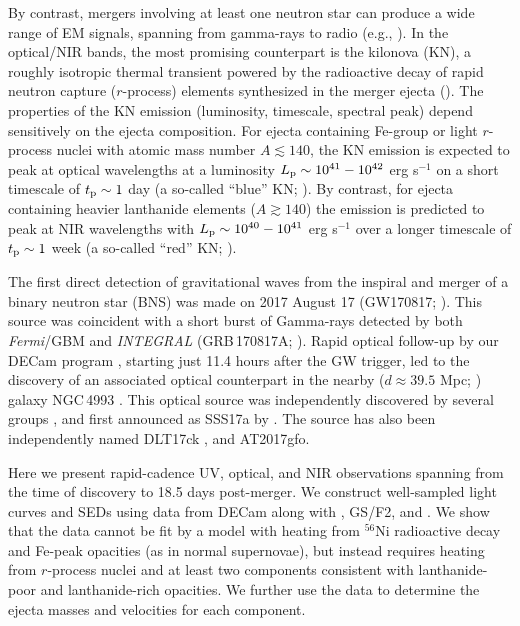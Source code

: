 By contrast, mergers involving at least one neutron star can produce a wide range of EM signals, spanning from gamma-rays to radio (e.g., \citealt{MetzgerBerger12}). In the optical/NIR bands, the most promising counterpart is the kilonova (KN), a roughly isotropic thermal transient powered by the radioactive decay of rapid neutron capture ($r$-process) elements synthesized in the merger ejecta (\citealt{LP98,Metzger+10,Roberts+11,MetzgerBerger12,BarnesKasen13,Tanaka+14}).
The properties of the KN emission (luminosity, timescale, spectral peak) depend sensitively on the ejecta composition.  For ejecta containing Fe-group or light $r$-process nuclei with atomic mass number $A\lesssim 140$, the KN emission is expected to peak at optical wavelengths at a luminosity $L_{\rm p}\sim 10^{41}-10^{42}$ erg s$^{-1}$ on a short timescale of $t_{\rm p}\sim 1$ day (a so-called ``blue'' KN; \citealt{Metzger+10,Roberts+11,MetzgerFernandez14}).  By contrast, for ejecta containing heavier lanthanide elements ($A\gtrsim 140$) the emission is predicted to peak at NIR wavelengths with $L_{\rm p} \sim 10^{40}-10^{41}$ erg s$^{-1}$ over a longer timescale of $t_{\rm p}\sim 1$ week (a so-called ``red'' KN; \citealt{BarnesKasen13,Kasen+13,Tanaka+14}).

The first direct detection of gravitational waves from the inspiral and merger of a binary neutron star (BNS) was made on 2017 August 17 (GW170817; \citealt{LIGOGW170817}). This source was coincident with a short burst of Gamma-rays detected by both {\it Fermi}/GBM and {\it INTEGRAL} (GRB\,170817A; \citealt{GW170817Fermi,Savchenko+17}). Rapid optical follow-up by our DECam program \citep{Flaugher+15}, starting just 11.4 hours after the GW trigger, led to the discovery of an associated optical counterpart in the nearby ($d\approx 39.5$ Mpc; \citealt{Freedman+01}) galaxy NGC\,4993 \citep{GW170817DECam}. This optical source was independently discovered by several groups \citep{LIGOMMAPaper}, and first announced as SSS17a by \cite{Coulter+17}. The source has also been independently named DLT17ck \citep{Valenti+17}, and AT2017gfo.

Here we present rapid-cadence UV, optical, and NIR observations spanning from the time of discovery to 18.5 days post-merger.  We construct well-sampled light curves and SEDs using data from DECam along with \swift, GS/F2, and \HST. We show that the data cannot be fit by a model with heating from $^{56}$Ni radioactive decay and Fe-peak opacities (as in normal supernovae), but instead requires heating from $r$-process nuclei and at least two components consistent with lanthanide-poor and lanthanide-rich opacities. We further use the data to determine the ejecta masses and velocities for each component.

